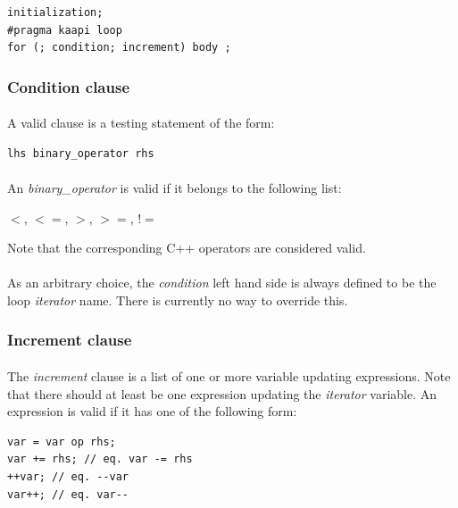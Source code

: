 \documentclass[a4paper, 11pt]{article}
\begin{document}
\begin{small}
\lstset{language=C}
\begin{lstlisting}[frame=tb]
initialization;
#pragma kaapi loop
for (; condition; increment) body ;
\end{lstlisting}
\end{small}

\subsubsection{Condition clause}
\paragraph{}
A valid clause is a testing statement of the form:\\
\begin{small}
\lstset{language=C}
\begin{lstlisting}[frame=tb]
lhs binary_operator rhs
\end{lstlisting}
\end{small}
\paragraph{}
An \textit{binary\_operator} is valid if it belongs to the following list:
\begin{center} $<$, $<=$, $>$, $>=$, $!=$ \end{center}
Note that the corresponding C++ operators are considered valid.
\paragraph{}
As an arbitrary choice, the \textit{condition} left hand side is always defined to be the loop
\textit{iterator} name. There is currently no way to override this.

\subsubsection{Increment clause}
\paragraph{}
The \textit{increment} clause is a list of one or more variable updating expressions. Note that
there should at least be one expression updating the \textit{iterator} variable. An expression is
valid if it has one of the following form:\\
\begin{small}
\lstset{language=C}
\begin{lstlisting}[frame=tb]
var = var op rhs;
var += rhs; // eq. var -= rhs
++var; // eq. --var
var++; // eq. var--
\end{lstlisting}
\end{small}
\end{document}
